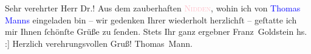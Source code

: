 \pstart{}Sehr verehrter Herr Dr.!\pend\vspace{0.5em}
\pstart
           Aus dem zauberhaften \textcolor{pink}{\textsc{Nidden}}\ledrightnote{\textcolor{pink}{Nida}}, wohin ich von
               \textcolor{blue}{Thomas Manns}\ledrightnote{{$\rightarrow$}\emph{\textcolor{blue}{Katia Mann}}} eingeladen bin – wir gedenken Ihrer wiederholt
            herzlichſt – geſtatte ich mir Ihnen ſchönſte Grüße zu ſenden. Stets Ihr ganz ergebner\pend
           \pstart \spacefill\mbox{Franz Goldstein}\pend{}\vspace{1em}
\pstart
           \noindent{}{[}hs. :{]} Herzlich verehrungsvollen Gruß!\pend
           \pstart \spacefill\mbox{Thomas Mann.}\pend{}\endnumbering{}
\begin{anhang}
\end{anhang}
      